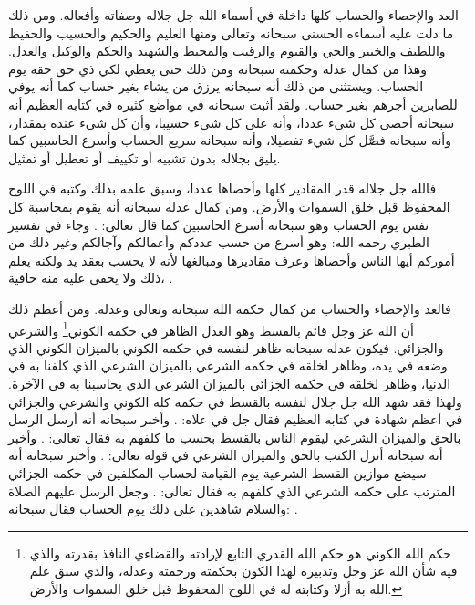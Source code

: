 العد والإحصاء والحساب كلها داخلة في أسماء الله جل جلاله وصفاته وأفعاله. ومن ذلك ما دلت عليه أسماءه الحسنى سبحانه وتعالى ومنها العليم والحكيم والحسيب والحفيظ واللطيف والخبير والحي والقيوم والرقيب والمحيط والشهيد والحكم والوكيل والعدل. وهذا من كمال عدله وحكمته سبحانه ومن ذلك حتى يعطي لكي ذي حق حقه يوم الحساب. ويستثنى من ذلك أنه سبحانه يرزق من يشاء بغير حساب كما أنه يوفي للصابرين أجرهم بغير حساب. ولقد أثبت سبحانه في مواضع كثيره في كتابه العظيم أنه سبحانه أحصى كل شيء عددا، وأنه على كل شيء حسيبا، وأن كل شيء عنده بمقدار، وأنه سبحانه فصَّل كل شيء تفصيلا، وأنه سبحانه سريع الحساب وأسرع الحاسبين كما يليق بجلاله بدون تشبيه أو تكييف أو تعطيل أو تمثيل. 

فالله جل جلاله قدر المقادير كلها وأحصاها عددا، وسبق علمه بذلك وكتبه في اللوح المحفوظ قبل خلق السموات والأرض. ومن كمال عدله سبحانه أنه يقوم بمحاسبة كل نفس يوم الحساب وهو سبحانه أسرع الحاسبين كما قال تعالى: \quranayah*[6][62]{\footnotesize \surahname*[6]}. وجاء في تفسير الطبري رحمه الله: وهو أسرع من حسب عددكم وأعمالكم وآجالكم وغير ذلك من أموركم أيها الناس وأحصاها وعرف مقاديرها ومبالغها لأنه لا يحسب بعقد يد ولكنه يعلم ذلك ولا يخفى عليه منه خافية، \quranayah*[34][3][13]{\footnotesize \surahname*[34]} \href{https://shamela.ws/book/7798/6327#p1}{\faExternalLink} \cite{tafsir_Tabari}.

فالعد والإحصاء والحساب من كمال حكمة الله سبحانه وتعالى وعدله. ومن أعظم ذلك أن الله عز وجل قائم بالقسط وهو العدل الظاهر في حكمه الكوني\footnote{حكم الله الكوني هو حكم الله القدري التابع لإرادته والقضاءي النافذ بقدرته والذي فيه شأن الله عز وجل وتدبيره لهذا الكون بحكمته ورحمته وعدله، والذي سبق علم الله به أزلا وكتابته له في اللوح المحفوظ قبل خلق السموات والأرض.} والشرعي والجزائي. فيكون عدله سبحانه ظاهر لنفسه في حكمه الكوني بالميزان الكوني الذي وضعه في يده، وظاهر لخلقه في حكمه الشرعي بالميزان الشرعي الذي كلفنا به في الدنيا، وظاهر لخلقه في حكمه الجزائي بالميزان الشرعي الذي يحاسبنا به في الآخرة. ولهذا فقد شهد الله جل جلال لنفسه بالقسط في حكمه كله الكوني والشرعي والجزائي في أعظم شهادة في كتابه العظيم فقال جل في علاه: \quranayah*[3][18]{\footnotesize \surahname*[3]}. وأخبر سبحانه أنه أرسل الرسل بالحق والميزان الشرعي ليقوم الناس بالقسط بحسب ما كلفهم به فقال تعالى: \quranayah*[57][25][1-11]{\footnotesize (\surahname*[57])}. وأخبر أنه سبحانه أنزل الكتب بالحق والميزان الشرعي في قوله تعالى: \quranayah*[42][17]{\footnotesize (\surahname*[42])}. وأخبر سبحانه أنه سيضع موازين القسط الشرعية يوم القيامة لحساب المكلفين في حكمه الجزائي المترتب على حكمه الشرعي الذي كلفهم به فقال تعالى: \quranayah*[21][47]{\footnotesize \surahname*[21]}. وجعل الرسل عليهم الصلاة والسلام شاهدين على ذلك يوم الحساب فقال سبحانه: \quranayah*[10][47]{\footnotesize \surahname*[10]}.

